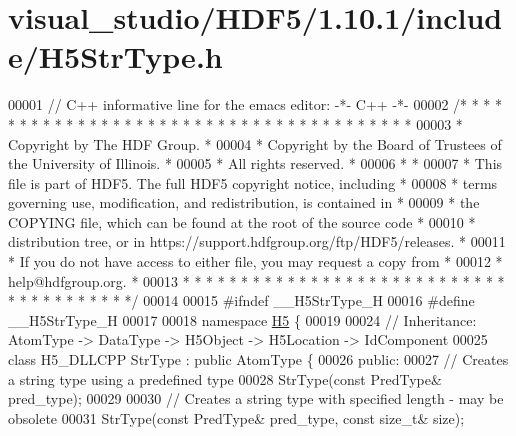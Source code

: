 \hypertarget{visual__studio_2_h_d_f5_21_810_81_2include_2_h5_str_type_8h_source}{}\section{visual\+\_\+studio/\+H\+D\+F5/1.10.1/include/\+H5\+Str\+Type.h}
\label{visual__studio_2_h_d_f5_21_810_81_2include_2_h5_str_type_8h_source}

\begin{DoxyCode}
00001 \textcolor{comment}{// C++ informative line for the emacs editor: -*- C++ -*-}
00002 \textcolor{comment}{/* * * * * * * * * * * * * * * * * * * * * * * * * * * * * * * * * * * * * * *}
00003 \textcolor{comment}{ * Copyright by The HDF Group.                                               *}
00004 \textcolor{comment}{ * Copyright by the Board of Trustees of the University of Illinois.         *}
00005 \textcolor{comment}{ * All rights reserved.                                                      *}
00006 \textcolor{comment}{ *                                                                           *}
00007 \textcolor{comment}{ * This file is part of HDF5.  The full HDF5 copyright notice, including     *}
00008 \textcolor{comment}{ * terms governing use, modification, and redistribution, is contained in    *}
00009 \textcolor{comment}{ * the COPYING file, which can be found at the root of the source code       *}
00010 \textcolor{comment}{ * distribution tree, or in https://support.hdfgroup.org/ftp/HDF5/releases.  *}
00011 \textcolor{comment}{ * If you do not have access to either file, you may request a copy from     *}
00012 \textcolor{comment}{ * help@hdfgroup.org.                                                        *}
00013 \textcolor{comment}{ * * * * * * * * * * * * * * * * * * * * * * * * * * * * * * * * * * * * * * */}
00014 
00015 \textcolor{preprocessor}{#ifndef \_\_H5StrType\_H}
00016 \textcolor{preprocessor}{#define \_\_H5StrType\_H}
00017 
00018 \textcolor{keyword}{namespace }\hyperlink{namespace_h5}{H5} \{
00019 
00024 \textcolor{comment}{//  Inheritance: AtomType -> DataType -> H5Object -> H5Location -> IdComponent}
00025 \textcolor{keyword}{class }H5\_DLLCPP StrType : \textcolor{keyword}{public} AtomType \{
00026    \textcolor{keyword}{public}:
00027         \textcolor{comment}{// Creates a string type using a predefined type}
00028         StrType(\textcolor{keyword}{const} PredType& pred\_type);
00029 
00030         \textcolor{comment}{// Creates a string type with specified length - may be obsolete}
00031         StrType(\textcolor{keyword}{const} PredType& pred\_type, \textcolor{keyword}{const} \textcolor{keywordtype}{size\_t}& size);

\end{DoxyCode}
